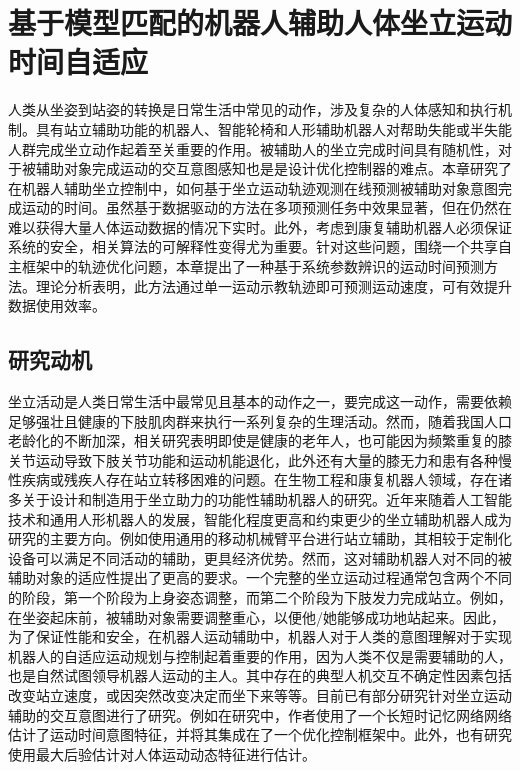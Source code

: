 \chapter{基于模型匹配的机器人辅助人体坐立运动时间自适应}
人类从坐姿到站姿的转换是日常生活中常见的动作，涉及复杂的人体感知和执行机制。具有站立辅助功能的机器人、智能轮椅和人形辅助机器人对帮助失能或半失能人群完成坐立动作起着至关重要的作用。被辅助人的坐立完成时间具有随机性，对于被辅助对象完成运动的交互意图感知也是是设计优化控制器的难点。本章研究了在机器人辅助坐立控制中，如何基于坐立运动轨迹观测在线预测被辅助对象意图完成运动的时间。虽然基于数据驱动的方法在多项预测任务中效果显著，但在仍然在难以获得大量人体运动数据的情况下实时。此外，考虑到康复辅助机器人必须保证系统的安全，相关算法的可解释性变得尤为重要。针对这些问题，围绕一个共享自主框架中的轨迹优化问题，本章提出了一种基于系统参数辨识的运动时间预测方法。理论分析表明，此方法通过单一运动示教轨迹即可预测运动速度，可有效提升数据使用效率。

\section{研究动机}
坐立活动是人类日常生活中最常见且基本的动作之一，要完成这一动作，需要依赖足够强壮且健康的下肢肌肉群来执行一系列复杂的生理活动。然而，随着我国人口老龄化的不断加深，相关研究表明即使是健康的老年人，也可能因为频繁重复的膝关节运动导致下肢关节功能和运动机能退化\cite{heidariKneeOsteoarthritisPrevalence2011}，此外还有大量的膝无力和患有各种慢性疾病或残疾人存在站立转移困难的问题。在生物工程和康复机器人领域，存在诸多关于设计和制造用于坐立助力的功能性辅助机器人的研究。近年来随着人工智能技术和通用人形机器人的发展，智能化程度更高和约束更少的坐立辅助机器人成为研究的主要方向。例如使用通用的移动机械臂平台进行站立辅助，其相较于定制化设备可以满足不同活动的辅助，更具经济优势\cite{liIntegratedApproachRobotic2021}。然而，这对辅助机器人对不同的被辅助对象的适应性提出了更高的要求。一个完整的坐立运动过程通常包含两个不同的阶段，第一个阶段为上身姿态调整，而第二个阶段为下肢发力完成站立。例如，在坐姿起床前，被辅助对象需要调整重心，以便他/她能够成功地站起来。因此，为了保证性能和安全，在机器人运动辅助中，机器人对于人类的意图理解对于实现机器人的自适应运动规划与控制起着重要的作用，因为人类不仅是需要辅助的人，也是自然试图领导机器人运动的主人。其中存在的典型人机交互不确定性因素包括改变站立速度，或因突然改变决定而坐下来等等。目前已有部分研究针对坐立运动辅助的交互意图进行了研究。例如在研究\cite{liIntegratedApproachRobotic2021}中，作者使用了一个长短时记忆网络网络估计了运动时间意图特征，并将其集成在了一个优化控制框架中。此外，也有研究使用最大后验估计对人体运动动态特征进行估计\cite{romanoCoDyCoProjectAchievements2018}。

